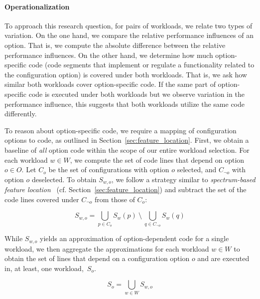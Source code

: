 
\paragraph*{Operationalization}
To approach this research question, for pairs of workloads, we relate two types of variation. On the one hand, we compare the relative performance influences of an option. That is, we compute the absolute difference between the relative performance influences. On the other hand, we determine how much option-specific code (code segments that implement or regulate a functionality related to the configuration option) is covered under both workloads. That is, we ask how similar both workloads cover option-specific code. If the same part of option-specific code is executed under both workloads but we observe variation in the performance influence, this suggests that both workloads utilize the same code differently.

To reason about option-specific code, we require a mapping of configuration options to code, as outlined in Section~\ref{sec:feature_location}. First, we obtain a baseline of \textit{all} option code within the scope of our entire workload selection. For each workload $w \in W$, we compute the set of code lines that depend on option $o \in O$. Let $C_{o}$ be the set of configurations with option $o$ selected, and $C_{\neg o}$ with option $o$ deselected. To obtain $S_{w, o}$, we follow a strategy similar to \textit{spectrum-based feature location}~\cite{michelon_spectrum_2021} (cf. Section~\ref{sec:feature_location}) and subtract the set of the code lines covered under $C_{\neg o}$ from those of $C_{o}$:

\begin{equation}%
	S_{w, o} = \bigcup_{p \in C_{o}} S_{w}(p) ~ \setminus ~ \bigcup_{q \in C_{\neg o}} S_{w}(q)
\end{equation}

While $S_{w, o}$ yields an approximation of option-dependent code for a single workload, we then aggregate the approximations for each workload $w \in W$ to obtain the set of lines that depend on a configuration option $o$ and are executed in, at least, one workload,~$S_{o}$. 

\begin{equation}
	S_{o} = \bigcup_{w \in W} S_{w, o}
\end{equation}

